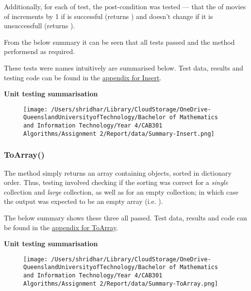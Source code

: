 \documentclass[a4paper]{article}
\begin{document}
\noindent
Additionally, for each of test, the post-condition was tested --- that the  of movies of increments by 1 if  is successful (returns ) and doesn't change if it is unsuccessfull (returns ).
\vspace{2mm}

\noindent
From the below summary it can be seen that all tests passed and the method performend as required.
\vspace{4mm}

\noindent
These tests were names intuitively are summarised below. Test data, results and testing code can be found in the \hyperlink{subsubsection.5.3.2}{appendix for Insert}.
\vspace{1mm}

\noindent
\textbf{Unit testing summarisation}
\begin{figure}[H]
   \texttt{[image: /Users/shridhar/Library/CloudStorage/OneDrive-QueenslandUniversityofTechnology/Bachelor of Mathematics and Information Technology/Year 4/CAB301 Algorithms/Assignment 2/Report/data/Summary-Insert.png]}
\end{figure}

\subsubsection{ToArray{()}}
The  method simply returns an  array containing  objects, sorted in dictionary order. Thus, testing involved checking if the sorting was correct for a \textit{single} collection and \textit{large} collection, as well as for an empty collection; in which case the output was expected to be an empty  array (i.e. ). 
\vspace{1mm}

\noindent
The below summary shows these three all passed. Test data, results and code can be found in the \hyperlink{subsubsection.5.3.3}{appendix for ToArray}.
\vspace{2mm}

\noindent
\textbf{Unit testing summarisation}
\begin{figure}[H]
   \texttt{[image: /Users/shridhar/Library/CloudStorage/OneDrive-QueenslandUniversityofTechnology/Bachelor of Mathematics and Information Technology/Year 4/CAB301 Algorithms/Assignment 2/Report/data/Summary-ToArray.png]}
\end{figure}
\end{document}

